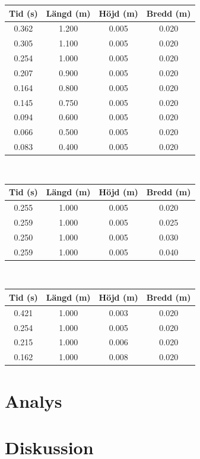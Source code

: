 \documentclass[10pt, titlepage, oneside, a4paper]{article}
\begin{document}
    \begin{tabular}{cccc}
        \hline
        Tid (s) & Längd (m) & Höjd (m) & Bredd (m)\\
        \hline
        0.362 & 1.200 & 0.005 & 0.020\\
        0.305 & 1.100 & 0.005 & 0.020\\
        0.254 & 1.000 & 0.005 & 0.020\\
        0.207 & 0.900 & 0.005 & 0.020\\
        0.164 & 0.800 & 0.005 & 0.020\\
        0.145 & 0.750 & 0.005 & 0.020\\
        0.094 & 0.600 & 0.005 & 0.020\\
        0.066 & 0.500 & 0.005 & 0.020\\
        0.083 & 0.400 & 0.005 & 0.020\\
    \end{tabular}\\
    \begin{tabular}{cccc}
        \hline
        Tid (s) & Längd (m) & Höjd (m) & Bredd (m)\\
        \hline
        0.255 & 1.000 & 0.005 & 0.020\\
        0.259 & 1.000 & 0.005 & 0.025\\
        0.250 & 1.000 & 0.005 & 0.030\\
        0.259 & 1.000 & 0.005 & 0.040\\
    \end{tabular}\\
    \begin{tabular}{cccc}
        \hline
        Tid (s) & Längd (m) & Höjd (m) & Bredd (m)\\
        \hline
        0.421 & 1.000 & 0.003 & 0.020\\
        0.254 & 1.000 & 0.005 & 0.020\\
        0.215 & 1.000 & 0.006 & 0.020\\
        0.162 & 1.000 & 0.008 & 0.020\\
    \end{tabular}
	\section{Analys}
    \section{Diskussion}
\end{document}
